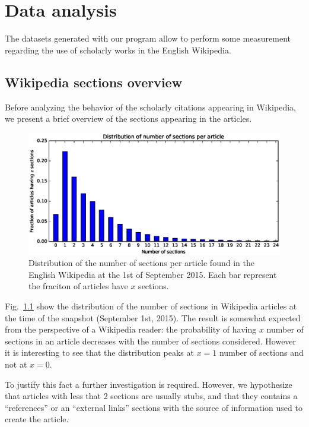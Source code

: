 
\chapter{Data analysis}
\label{cha:data_analysis}
The datasets generated with our program allow to perform some measurement regarding the use of scholarly works in the English Wikipedia.

\section{Wikipedia sections overview}
Before analyzing the behavior of the scholarly citations appearing in Wikipedia, we present a brief overview of the sections appearing in the articles.

\begin{figure}[h]
\centering
\includegraphics[keepaspectratio=true, width=\textwidth]{assets/section_counts_last_pdf}
\caption{Distribution of the number of sections per article found in the English Wikipedia at the 1st of September 2015.
Each bar represent the fraciton of articles have $x$ sections.}
\label{fig:section_counts_last_pdf}
\end{figure}

Fig.~\ref{fig:section_counts_last_pdf} show the distribution of the number of sections in Wikipedia articles at the time of the snapshot (September 1st, 2015).
The result is somewhat expected from the perspective of a Wikipedia reader: the probability of having $x$ number of sections in an article decreases with the number of sections considered.
However it is interesting to see that the distribution peaks at $x = 1$ number of sections and not at $x = 0$.

To justify this fact a further investigation is required.
However, we hypothesize that articles with less that 2 sections are usually stubs, and that they contains a ``references'' or an ``external links'' sections with the source of information used to create the article.

